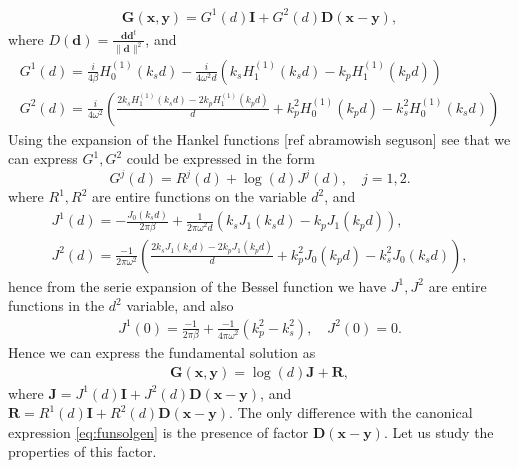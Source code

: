 \documentclass{article}
\newcommand{\todo}[1]{{\color{red}[#1]}}
\newcommand{\bx}{\bm{x}}
\newcommand{\by}{\bm{y}}
\begin{document}
\begin{align*}
\mathbf{G}(\mathbf{x},\mathbf{y})  = G^1(d) \mathbf{I} + 
{G}^2(d)\mathbf{D}(\mathbf{x}-\mathbf{y}),
\end{align*}
where  $D(\mathbf{d}) = \frac{\mathbf{d} \mathbf{d}^t}{\|\mathbf{d}\|^2}$, and 
\begin{align*}
G^1(d) = \frac{i}{4\beta} H_{0}^{(1)}(k_s d) - \frac{i}{4\omega^2d}(k_s H_1^{(1)}(k_s d)- k_p H_1^{(1)}(k_p d)) \\
G^2(d) = \frac{i}{4\omega^2} \left( 
\frac{2k_s H^{(1)}_1(k_s d)-2k_p H^{(1)}_1(k_p d)}{d}+
k_p^2H^{(1)}_0(k_p d)- k_s^2H^{(1)}_0(k_s d)  
\right)
\end{align*}
Using the expansion of the Hankel functions \todo{ref abramowish seguson} see that we can express $G^1,G^2$ could be expressed in the form 
$$
G^j(d) = R^j(d) +\log(d)J^j(d), \quad j=1,2.
$$
where $R^1,R^2$ are entire functions on the variable $d^2$, and 
\begin{align*}
J^1(d) = -\frac{J_0(k_s d)}{2\pi\beta}+ \frac{1}{2\pi\omega^2 d}(k_sJ_1(k_s d) - k_p J_1(k_p d)), \\
J^2(d) = \frac{-1}{2 \pi \omega^2} \left(
\frac{2k_s J_1(k_sd)-2k_p J_1(k_p d)}{d} +k_p^2J_0(k_p d) -k_s^2J_0(k_s d)
\right),
\end{align*}
hence from the serie expansion of the Bessel function we have $J^1,J^2$ are entire functions in the $d^2$ variable, and also 
\begin{align*}
J^1(0) = \frac{-1}{2\pi\beta} + \frac{-1}{4 \pi\omega^2}(k_p^2-k_s^2), \quad J^2(0) = 0.
\end{align*}
Hence we can express the fundamental solution as 
\begin{align*}
\mathbf{G}(\bx,\by) = \log(d)\mathbf{J}+ \mathbf{R},
\end{align*}
where $\mathbf{J} = J^1(d) \mathbf{I} +J^2(d)\mathbf{D}(\bx-\by)$, and 
$\mathbf{R} = R^1(d) \mathbf{I} +R^2(d) \mathbf{D}(\bx-\by)$. The only difference with the canonical expression  \eqref{eq:funsolgen} is the presence of factor $\mathbf{D}(\bx-\by)$. Let us study the properties of this factor. 
\end{document}
